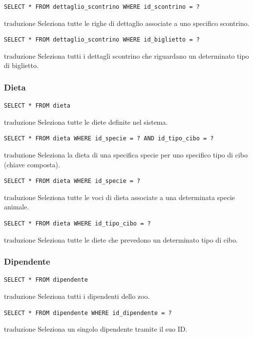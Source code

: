 \documentclass[12pt,a4paper]{report}
\begin{document}
\begin{lstlisting}[style=sqlstyle]
SELECT * FROM dettaglio_scontrino WHERE id_scontrino = ?
\end{lstlisting}
traduzione {Seleziona tutte le righe di dettaglio associate a uno specifico scontrino.}

\begin{lstlisting}[style=sqlstyle]
SELECT * FROM dettaglio_scontrino WHERE id_biglietto = ?
\end{lstlisting}
traduzione {Seleziona tutti i dettagli scontrino che riguardano un determinato tipo di biglietto.}

\subsubsection*{Dieta}
\begin{lstlisting}[style=sqlstyle]
SELECT * FROM dieta
\end{lstlisting}
traduzione {Seleziona tutte le diete definite nel sistema.}

\begin{lstlisting}[style=sqlstyle]
SELECT * FROM dieta WHERE id_specie = ? AND id_tipo_cibo = ?
\end{lstlisting}
traduzione {Seleziona la dieta di una specifica specie per uno specifico tipo di cibo (chiave composta).}

\begin{lstlisting}[style=sqlstyle]
SELECT * FROM dieta WHERE id_specie = ?
\end{lstlisting}
traduzione {Seleziona tutte le voci di dieta associate a una determinata specie animale.}

\begin{lstlisting}[style=sqlstyle]
SELECT * FROM dieta WHERE id_tipo_cibo = ?
\end{lstlisting}
traduzione {Seleziona tutte le diete che prevedono un determinato tipo di cibo.}

\subsubsection*{Dipendente}
\begin{lstlisting}[style=sqlstyle]
SELECT * FROM dipendente
\end{lstlisting}
traduzione {Seleziona tutti i dipendenti dello zoo.}

\begin{lstlisting}[style=sqlstyle]
SELECT * FROM dipendente WHERE id_dipendente = ?
\end{lstlisting}
traduzione {Seleziona un singolo dipendente tramite il suo ID.}
\end{document}
